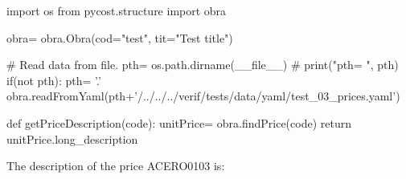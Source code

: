 \documentclass[11pt]{article}%
\begin{document}
 
 
 
\begin{pycode} 
 
import os
from pycost.structure import obra

obra= obra.Obra(cod="test", tit="Test title")

# Read data from file.
pth= os.path.dirname(__file__)
# print("pth= ", pth)
if(not pth):
    pth= '.'
obra.readFromYaml(pth+'/../../../verif/tests/data/yaml/test_03_prices.yaml')

def getPriceDescription(code):
    unitPrice= obra.findPrice(code)
    return unitPrice.long_description

\end{pycode} 
 
The description of the price ACERO0103 is:  
\end{document}
